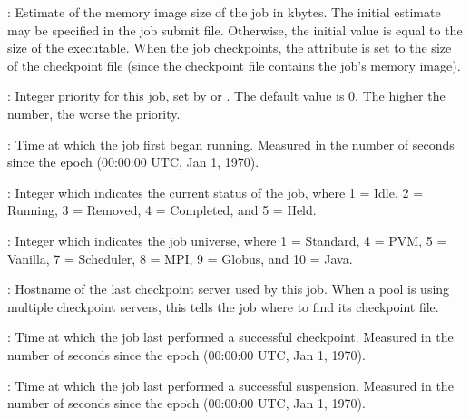 \begin{description}
\item[\AdAttr{ImageSize}] : Estimate of the memory image size of the
job in kbytes.  The initial estimate may be specified in the job
submit file.  Otherwise, the initial value is equal to the size of the
executable.  When the job checkpoints, the 
attribute is set to the size of the checkpoint file (since the
checkpoint file contains the job's memory image).

\item[\AdAttr{JobPrio}] : Integer priority for this job, set by
 or .  The default value is 0.  The higher
the number, the worse the priority.

\item[\AdAttr{JobStartDate}] : Time at which the job first began
running.  Measured in the
number of seconds since the epoch (00:00:00 UTC, Jan 1, 1970).

\item[\AdAttr{JobStatus}] : Integer which indicates the current
status of the job, where 1 = Idle, 2 = Running, 3 = Removed, 4 =
Completed, and 5 = Held.

\item[\AdAttr{JobUniverse}] : Integer which indicates the job
universe, where 1 = Standard, 4 = PVM, 5 = Vanilla, 7 = Scheduler,
8 = MPI, 9 = Globus, and 10 = Java.

\item[\AdAttr{LastCkptServer}] : Hostname of the last checkpoint
server used by this job.  When a pool is using multiple checkpoint
servers, this tells the job where to find its checkpoint file.

\item[\AdAttr{LastCkptTime}] : Time at which the job last performed a
successful checkpoint.  Measured in the number of seconds since the
epoch (00:00:00 UTC, Jan 1, 1970).

\item[\AdAttr{LastSuspensionTime}] : Time at which the job last performed a
successful suspension.  Measured in the number of seconds since the
epoch (00:00:00 UTC, Jan 1, 1970).


\end{description}
